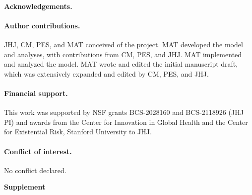 \documentclass[letterpaper,11.5pt]{scrartcl}
\newcommand{\mt}[1]{{\textcolor{myorange} {({\tiny MT:} #1)}}}
\newcommand{\cm}[1]{{\textcolor{mypurple} {({\tiny CM:} #1)}}}
\begin{document}
\paragraph{Acknowledgements.} %
% 

\paragraph{Author contributions.} JHJ, CM, PES, and MAT conceived of the project. MAT developed the model
and analyses, with contributions from CM, PES, and JHJ. MAT implemented and analyzed the model. MAT wrote and edited the initial manuscript draft, which was extensively expanded and edited by CM, PES, and JHJ.

\paragraph{Financial support.} This work was supported by NSF grants BCS-2028160 and BCS-2118926 (JHJ PI) and awards from the Center for Innovation in Global Health and the Center for Existential Risk, Stanford University to JHJ.

\paragraph{Conflict of interest.} No conflict declared.





\pagebreak
\begin{center}
  \textbf{\Large \textsf{Supplement}}
\end{center}
\setcounter{equation}{1}
\setcounter{figure}{0}
\setcounter{section}{0}
\setcounter{table}{0}
\setcounter{page}{1}
\makeatletter
\renewcommand{\theequation}{S\arabic{equation}}
\renewcommand{\thefigure}{S\arabic{figure}}
\renewcommand{\thetable}{S\arabic{table}}
\renewcommand{\thesection}{S\arabic{section}}
\renewcommand{\thepage}{S\arabic{page}}
\end{document}
